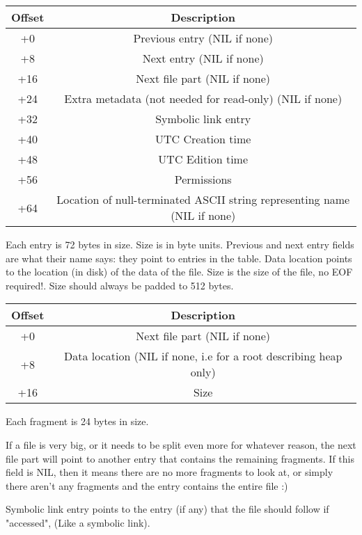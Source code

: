 \documentclass[12pt]{article}
\begin{document}
\begin{center}
\begin{tabular}{ |c|c| }
\hline
Offset & Description \\
\hline
+0 & Previous entry (NIL if none) \\
+8 & Next entry (NIL if none) \\
+16 & Next file part (NIL if none) \\
+24 & Extra metadata (not needed for read-only) (NIL if none) \\
+32 & Symbolic link entry \\
+40 & UTC Creation time \\
+48 & UTC Edition time \\
+56 & Permissions \\
+64 & Location of null-terminated ASCII string representing name (NIL if none) \\
\hline
\end{tabular}
\end{center}

Each entry is 72 bytes in size. Size is in byte units. Previous and next entry fields are what their name says: they point to entries in the table.
Data location points to the location (in disk) of the data of the file. Size is the size of the file, no EOF required!. Size should always be padded to 512 bytes.

\begin{center}
\begin{tabular}{ |c|c| }
\hline
Offset & Description \\
\hline
+0 & Next file part (NIL if none) \\
+8 & Data location (NIL if none, i.e for a root describing heap only) \\
+16 & Size \\
\hline
\end{tabular}
\end{center}

Each fragment is 24 bytes in size.

If a file is very big, or it needs to be split even more for whatever reason, the next file part will point to another entry that contains the remaining fragments. If this field is NIL, then it means there are no more fragments to look at, or simply there aren't any fragments and the entry contains the entire file :)

Symbolic link entry points to the entry (if any) that the file should follow if "accessed", (Like a symbolic link).
\end{document}
